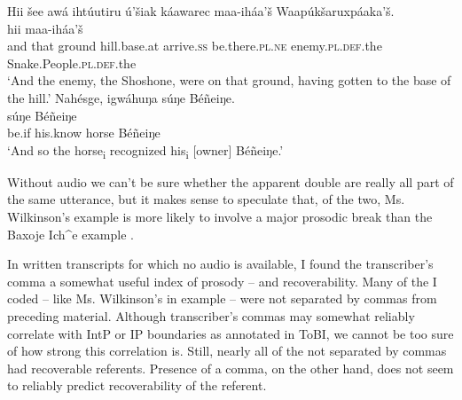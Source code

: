 \documentclass[output=paper]{LSP/langsci}
\begin{document}
\ea\label{multiplepostverbal}
\ea\label{wilkinsonmultiplepostverbal}
Hii šee awá ihtúutiru ú’šiak káawarec maa-iháa’š Waapúkšaruxpáaka’š.\rmfnm\\
\gll	hii 		 				 			 			maa-iháa’š 				\\
	and 		that	 		ground 			hill.base.at	 			arrive.\textsc{ss} 		be.there.\textsc{pl.ne}	enemy.\textsc{pl.def}.the 		Snake.People.\textsc{pl.def}.the\\
\glt	`And the enemy, the Shoshone, were on that ground, having gotten to the base of the hill.'
\ex\label{baxojemultiplepostverbal}
Nahésge, igwáhuŋa súŋe Béñeiŋe.\rmfnm\\
\gll	{}		súŋe 		Béñeiŋe\\
	be.if 			his.know 			horse 		Béñeiŋe\\
\glt	`And so the horse\textsubscript{i} recognized his\textsubscript{i} [owner] Béñeiŋe.'
\z\z

Without audio we can’t be sure whether the apparent double  are really all part of the same utterance, but it makes sense to speculate that, of the two, Ms. Wilkinson’s example  is more likely to involve a major prosodic break than the Baxoje Ich\^{}e example .

In written transcripts for which no audio is available, I found the transcriber’s comma a somewhat useful index of prosody -- and recoverability. Many of the  I coded -- like Ms. Wilkinson’s in example  -- were not separated by commas from preceding material. Although transcriber’s commas may somewhat reliably correlate with IntP or IP boundaries as annotated in ToBI, we cannot be too sure of how strong this correlation is. Still, nearly all of the  not separated by commas had recoverable referents. Presence of a comma, on the other hand, does not seem to reliably predict recoverability of the referent.
\end{document}
